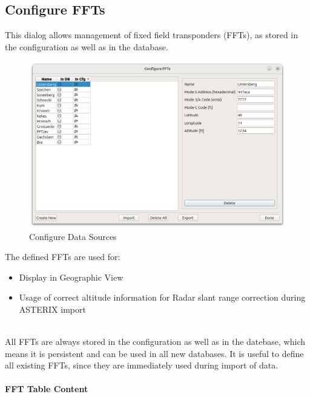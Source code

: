 \subsection{Configure FFTs}
\label{sec:ui_configure_ffts}

This dialog allows management of fixed field transponders (FFTs), as stored in the configuration as well as in the database. \\

\begin{figure}[H]
    \hspace*{-2cm}
    \includegraphics[width=18cm]{figures/configure_ffts.png}
  \caption{Configure Data Sources}
\end{figure}

The defined FFTs are used for:
\begin{itemize}
\item Display in Geographic View
\item Usage of correct altitude information for Radar slant range correction during ASTERIX import
\end{itemize}
\ \\

All FFTs are always stored in the configuration as well as in the datebase, which means it is persistent and can be used in all new databases. It is useful to define all existing FFTs, since they are immediately used during import of data. \\

\paragraph {FFT Table Content}
\label{sec:configure_ffts_table_content}

